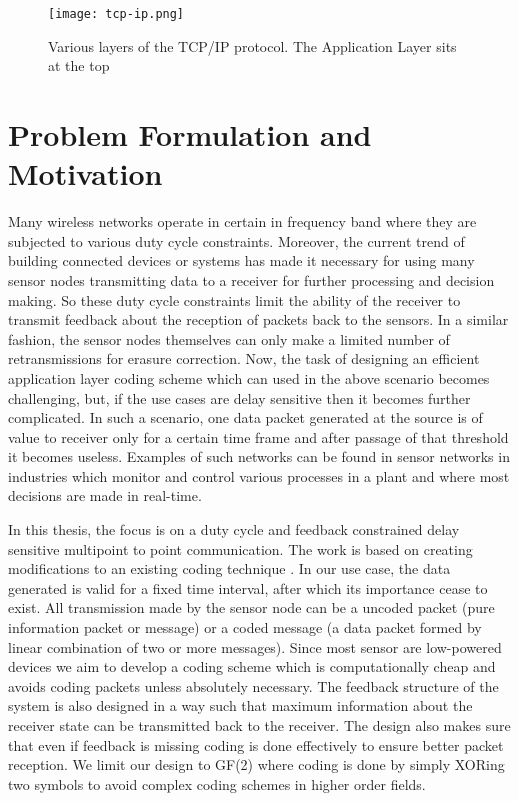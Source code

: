 
\begin{figure*}
	\centering
	\texttt{[image: tcp-ip.png]}
	\caption{Various layers of the TCP/IP protocol. The Application Layer sits at the top}
	\label{fig-1.1}
\end{figure*}

\newpage
\section{Problem Formulation and Motivation}
Many wireless networks operate in certain in frequency band where they are subjected to various duty cycle constraints. Moreover, the current trend of building connected devices or systems has made it necessary for using many sensor nodes transmitting data to a receiver for further processing and decision making. So these duty cycle constraints limit the ability of the receiver to transmit feedback about the reception of packets back to the sensors. In a similar fashion, the sensor nodes themselves can only make a limited number of retransmissions for erasure correction. Now, the task of designing an efficient application layer coding scheme which can used in the above scenario becomes challenging, but, if the use cases are delay sensitive then it becomes further complicated. In such a scenario, one data packet generated at the source is of value to receiver only for a certain time frame and after passage of that threshold it becomes useless. Examples of such networks can be found in sensor networks in industries which monitor and control various processes in a plant and where most decisions are made in real-time.

In this thesis, the focus is on a duty cycle and feedback constrained delay sensitive multipoint to point communication. The work is based on creating modifications to an existing coding technique \cite{borkotokyicc}. In our use case, the data generated is valid for a fixed time interval, after which its importance cease to exist. All transmission made by the sensor node can be a uncoded packet (pure information packet or message) or a coded message (a data packet formed by linear combination of two or more messages). Since most sensor are low-powered devices we aim to develop a coding scheme which is computationally cheap and avoids coding packets unless absolutely necessary. The feedback structure of the system is also designed in a way such that maximum information about the receiver state can be transmitted back to the receiver. The design also makes sure that even if feedback is missing coding is done effectively to ensure better packet reception. We limit our design to GF(2) where coding is done by simply XORing two symbols to avoid complex coding schemes in higher order fields.



